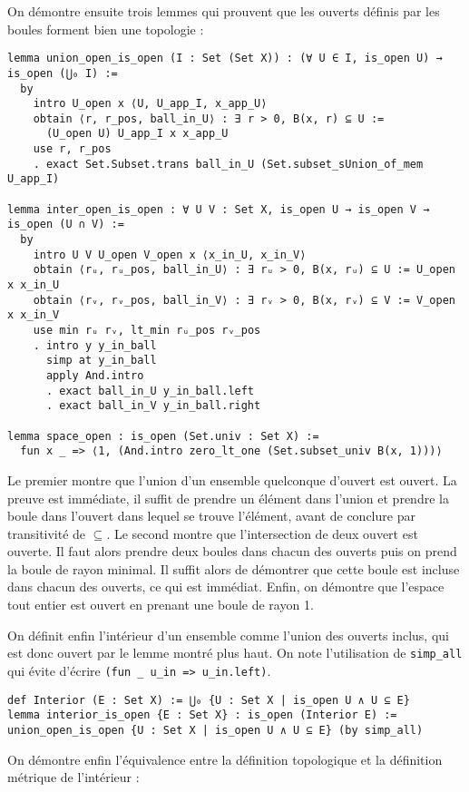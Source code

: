 \documentclass[a4paper, 12pt]{article}
\newcommand{\lean}[1]{\texttt{#1}}
\begin{document}
On démontre ensuite trois lemmes qui prouvent que les ouverts définis par les boules forment bien une topologie :

\begin{verbatim}
lemma union_open_is_open (I : Set (Set X)) : (∀ U ∈ I, is_open U) → is_open (⋃₀ I) :=
  by
    intro U_open x ⟨U, U_app_I, x_app_U⟩
    obtain ⟨r, r_pos, ball_in_U⟩ : ∃ r > 0, B(x, r) ⊆ U :=
      (U_open U) U_app_I x x_app_U
    use r, r_pos
    . exact Set.Subset.trans ball_in_U (Set.subset_sUnion_of_mem U_app_I)

lemma inter_open_is_open : ∀ U V : Set X, is_open U → is_open V → is_open (U ∩ V) :=
  by
    intro U V U_open V_open x ⟨x_in_U, x_in_V⟩
    obtain ⟨rᵤ, rᵤ_pos, ball_in_U⟩ : ∃ rᵤ > 0, B(x, rᵤ) ⊆ U := U_open x x_in_U
    obtain ⟨rᵥ, rᵥ_pos, ball_in_V⟩ : ∃ rᵥ > 0, B(x, rᵥ) ⊆ V := V_open x x_in_V
    use min rᵤ rᵥ, lt_min rᵤ_pos rᵥ_pos
    . intro y y_in_ball
      simp at y_in_ball
      apply And.intro
      . exact ball_in_U y_in_ball.left
      . exact ball_in_V y_in_ball.right

lemma space_open : is_open (Set.univ : Set X) :=
  fun x _ => ⟨1, (And.intro zero_lt_one (Set.subset_univ B(x, 1)))⟩
\end{verbatim}

Le premier montre que l'union d'un ensemble quelconque d'ouvert est ouvert. La preuve est immédiate, il suffit de prendre un élément dans l'union et prendre la boule dans l'ouvert dans lequel se trouve l'élément, avant de conclure par transitivité de $\subseteq$. Le second montre que l'intersection de deux ouvert est ouverte. Il faut alors prendre deux boules dans chacun des ouverts puis on prend la boule de rayon minimal. Il suffit alors de démontrer que cette boule est incluse dans chacun des ouverts, ce qui est immédiat. Enfin, on démontre que l'espace tout entier est ouvert en prenant une boule de rayon 1.

On définit enfin l'intérieur d'un ensemble comme l'union des ouverts inclus, qui est donc ouvert par le lemme montré plus haut. On note l'utilisation de \lean{simp_all} qui évite d'écrire \lean{(fun _ u_in => u_in.left)}.

\begin{verbatim}
def Interior (E : Set X) := ⋃₀ {U : Set X | is_open U ∧ U ⊆ E}
lemma interior_is_open {E : Set X} : is_open (Interior E) := union_open_is_open {U : Set X | is_open U ∧ U ⊆ E} (by simp_all)
\end{verbatim}

On démontre enfin l'équivalence entre la définition topologique et la définition métrique de l'intérieur :
\end{document}
